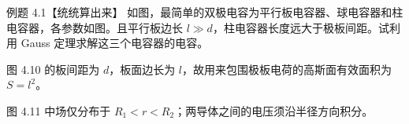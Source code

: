 \begin{origexamplebox}{例题 4.1【统统算出来】}
如图，最简单的双极电容为平行板电容器、球电容器和柱电容器，各参数如图。且平行板边长
$l\gg d$，柱电容器长度远大于极板间距。试利用 Gauss 定理求解这三个电容器的电容。
\begin{center}
\begin{minipage}{.53\linewidth}\emParallelQuestion\end{minipage}
\begin{minipage}{.40\linewidth}\emSphericalQuestion\end{minipage}
\end{center}
\label{fig:em-capacitors-question}
\begin{center}\end{center}
\label{fig:em-source-thirty-fifth-section-1}
\end{origexamplebox}

图 4.10 的板间距为 $d$，板面边长为 $l$，故用来包围极板电荷的高斯面有效面积为 $S=l^2$。

\exampleParallelFigure
{}

图 4.11 中场仅分布于 $R_1<r<R_2$；两导体之间的电压须沿半径方向积分。

\exampleSphericalFigure
{}

